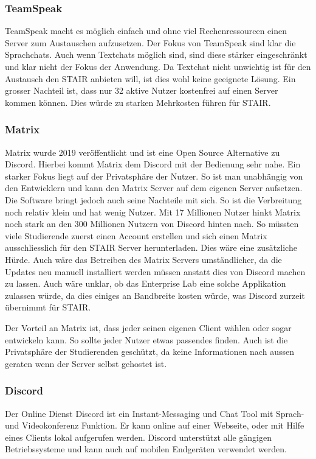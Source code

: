 \documentclass[a4paper, table]{article}
\begin{document}
\subsubsection*{TeamSpeak}

TeamSpeak macht es möglich einfach und ohne viel Rechenressourcen einen Server zum Austauschen aufzusetzen.
Der Fokus von TeamSpeak sind klar die Sprachchats.
Auch wenn Textchats möglich sind, sind diese stärker eingeschränkt und klar nicht der Fokus der Anwendung.
Da Textchat nicht unwichtig ist für den Austausch den STAIR anbieten will,
ist dies wohl keine geeignete Lösung.
Ein grosser Nachteil ist, dass nur 32 aktive Nutzer kostenfrei auf einen Server kommen können.
Dies würde zu starken Mehrkosten führen für STAIR.\autocite{mockel_discord_2022}

\subsubsection*{Matrix}

Matrix wurde 2019 veröffentlicht und ist eine Open Source Alternative zu Discord.
Hierbei kommt Matrix dem Discord mit der Bedienung sehr nahe.
Ein starker Fokus liegt auf der Privatsphäre der Nutzer.
So ist man unabhängig von den Entwicklern und kann den Matrix Server auf dem eigenen Server aufsetzen.
Die Software bringt jedoch auch seine Nachteile mit sich.
So ist die Verbreitung noch relativ klein und hat wenig Nutzer.
Mit 17 Millionen Nutzer\autocite{noauthor_matrixorg_nodate} hinkt Matrix noch stark an den 300 Millionen Nutzern von Discord hinten nach.\autocite{david_curry_discord_2022}
So müssten viele Studierende zuerst einen Account erstellen und sich einen Matrix ausschliesslich für den STAIR Server herunterladen. Dies wäre eine zusätzliche Hürde.
Auch wäre das Betreiben des Matrix Servers umständlicher, da die Updates neu manuell installiert werden müssen anstatt dies von Discord machen zu lassen.
Auch wäre unklar, ob das Enterprise Lab eine solche Applikation zulassen würde, da dies einiges an Bandbreite kosten würde, was Discord zurzeit übernimmt für STAIR.

Der Vorteil an Matrix ist, dass jeder seinen eigenen Client wählen oder sogar entwickeln kann.\autocite{noauthor_matrix_nodate}
So sollte jeder Nutzer etwas passendes finden.
Auch ist die Privatsphäre der Studierenden geschützt, da keine Informationen nach aussen geraten wenn der Server selbst gehostet ist.

\subsubsection{Discord}
Der Online Dienst Discord ist ein Instant-Messaging und Chat Tool mit Sprach- und Videokonferenz Funktion.
Er kann online auf einer Webseite, oder mit Hilfe eines Clients lokal aufgerufen werden.
Discord unterst\"utzt alle g\"angigen Betriebssysteme und kann auch auf mobilen Endger\"aten verwendet werden.
\end{document}
